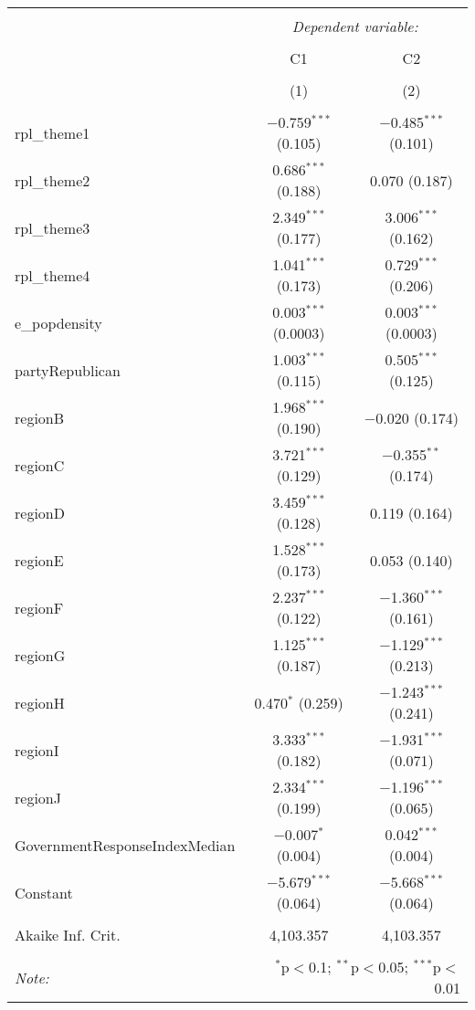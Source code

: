 
\begin{table}[!htbp] \centering 
  \caption{} 
  \label{} 
\begin{tabular}{@{\extracolsep{5pt}}lcc} 
\\[-1.8ex]\hline 
\hline \\[-1.8ex] 
 & \multicolumn{2}{c}{\textit{Dependent variable:}} \\ 
\cline{2-3} 
\\[-1.8ex] & C1 & C2 \\ 
\\[-1.8ex] & (1) & (2)\\ 
\hline \\[-1.8ex] 
 rpl\_theme1 & $-$0.759$^{***}$ (0.105) & $-$0.485$^{***}$ (0.101) \\ 
  rpl\_theme2 & 0.686$^{***}$ (0.188) & 0.070 (0.187) \\ 
  rpl\_theme3 & 2.349$^{***}$ (0.177) & 3.006$^{***}$ (0.162) \\ 
  rpl\_theme4 & 1.041$^{***}$ (0.173) & 0.729$^{***}$ (0.206) \\ 
  e\_popdensity & 0.003$^{***}$ (0.0003) & 0.003$^{***}$ (0.0003) \\ 
  partyRepublican & 1.003$^{***}$ (0.115) & 0.505$^{***}$ (0.125) \\ 
  regionB & 1.968$^{***}$ (0.190) & $-$0.020 (0.174) \\ 
  regionC & 3.721$^{***}$ (0.129) & $-$0.355$^{**}$ (0.174) \\ 
  regionD & 3.459$^{***}$ (0.128) & 0.119 (0.164) \\ 
  regionE & 1.528$^{***}$ (0.173) & 0.053 (0.140) \\ 
  regionF & 2.237$^{***}$ (0.122) & $-$1.360$^{***}$ (0.161) \\ 
  regionG & 1.125$^{***}$ (0.187) & $-$1.129$^{***}$ (0.213) \\ 
  regionH & 0.470$^{*}$ (0.259) & $-$1.243$^{***}$ (0.241) \\ 
  regionI & 3.333$^{***}$ (0.182) & $-$1.931$^{***}$ (0.071) \\ 
  regionJ & 2.334$^{***}$ (0.199) & $-$1.196$^{***}$ (0.065) \\ 
  GovernmentResponseIndexMedian & $-$0.007$^{*}$ (0.004) & 0.042$^{***}$ (0.004) \\ 
  Constant & $-$5.679$^{***}$ (0.064) & $-$5.668$^{***}$ (0.064) \\ 
 \hline \\[-1.8ex] 
Akaike Inf. Crit. & 4,103.357 & 4,103.357 \\ 
\hline 
\hline \\[-1.8ex] 
\textit{Note:}  & \multicolumn{2}{r}{$^{*}$p$<$0.1; $^{**}$p$<$0.05; $^{***}$p$<$0.01} \\ 
\end{tabular} 
\end{table} 
